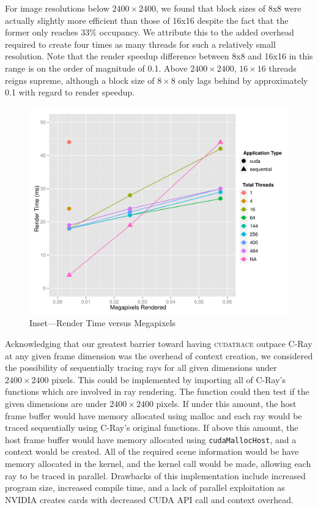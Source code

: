 \documentclass[12pt]{article}
\begin{document}
For image resolutions below $2400 \times 2400$, we found that block sizes of 8x8 were actually slightly more efficient than those of 16x16 despite the fact that the former only reaches 33\% occupancy. We attribute this to the added overhead required to create four times as many threads for such a relatively small resolution. Note that the render speedup difference between 8x8 and 16x16 in this range is on the order of magnitude of 0.1. Above $2400 \times 2400$, $16 \times 16$ threads reigns supreme, although a block size of $8 \times 8$ only lags behind by approximately 0.1 with regard to render speedup.

\begin{figure}
    \caption{Inset---Render Time versus Megapixels} \label{fig:render_no_jitter_time_zoom3}
    \begin{center}
\includegraphics{cudatrace-009}
    \end{center}
\end{figure}

Acknowledging that our greatest barrier toward having \textsc{cudatrace} outpace C-Ray at any given frame dimension was the overhead of context creation, we considered the possibility of sequentially tracing rays for all given dimensions under $2400 \times 2400$ pixels. This could be implemented by importing all of C-Ray's functions which are involved in ray rendering. The function could then test if the given dimensions are under $2400 \times 2400$ pixels. If under this amount, the host frame buffer would have memory allocated using malloc and each ray would be traced sequentially using C-Ray's original functions. If above this amount, the host frame buffer would have memory allocated using \texttt{cudaMallocHost}, and a context would be created. All of the required scene information would be have memory allocated in the kernel, and the kernel call would be made, allowing each ray to be traced in parallel. Drawbacks of this implementation include increased program size, increased compile time, and a lack of parallel exploitation as NVIDIA creates cards with decreased CUDA API call and context overhead. 
\end{document}
